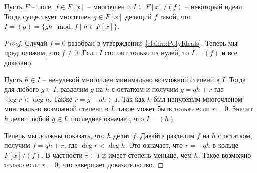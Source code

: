 \begin{claim}
\label{claim::PolyRemIdeals}
Пусть $F$ -- поле, $f\in F[x]$ -- многочлен и $I\subseteq F[x]/ (f)$ -- некоторый идеал.
Тогда существует многочлен $g\in F[x]$ делящий $f$ такой, что $I = (g) = \{g h\!\!\mod{f}\mid h\in F[x]\}$.
\end{claim}
\begin{proof}
Случай $f = 0$ разобран в утверждении~\ref{claim::PolyIdeals}.
Теперь мы предположим, что $f \neq 0$.
Если $I$ состоит только из нулей, то $I = (f)$ и все доказано.

Пусть $h\in I$ -- ненулевой многочлен минимально возможной степени в $I$.
Тогда для любого $g\in I$, разделим $g$ на $h$ с остатком и получим $g = qh + r$ где $\deg r < \deg h$.
Также $r = g - qh\in I$.
Так как $h$ был ненулевым многочленом минимально возможной степени в $I$, такое может быть только если $r = 0$.
Значит $h$ делит любой $g\in I$.
последнее означает, что $I = (h)$.

Теперь мы должны показать, что $h$ делит $f$.
Давайте разделим $f$ на $h$ с остатком, получим $f = qh + r$, где $\deg r < \deg h$.
Это означает, что $r = -qh$ в кольце $F[x]/(f)$.
В частности $r\in I$ и имеет степень меньше, чем $h$.
Такое возможно только если $r = 0$, что завершает доказательство.
\end{proof}


